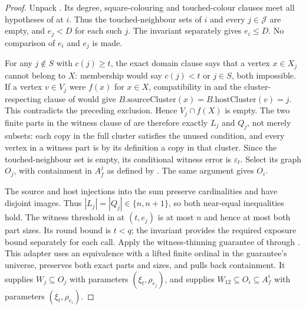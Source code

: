 \begin{proof}
Unpack . Its degree, square-colouring and
touched-colour clauses meet all hypotheses of
 at $i$. Thus the touched-neighbour
sets of $i$ and every $j\in\mathcal J$ are empty, and $e_j<D$ for each
such $j$. The invariant separately gives $e_i\le D$. No comparison of
$e_i$ and $e_j$ is made.

For any $j\notin S$ with $c(j)\ge t$, the exact domain clause says that
a vertex $x\in X_j$ cannot belong to $X$: membership would say
$c(j)<t$ or $j\in S$, both impossible. If a vertex $v\in V_j$ were
$f(x)$ for $x\in X$, compatibility in
 and the cluster-respecting clause
of  would give
$B.\mathrm{sourceCluster}(x)=B.\mathrm{hostCluster}(v)=j$.
This contradicts the preceding exclusion. Hence $V_j\cap f(X)$ is empty.
The two finite parts in the witness clause of
 are therefore exactly $L_j$ and $Q_j$,
not merely subsets: each copy in the full cluster satisfies the unused
condition, and every vertex in a witness part is by its definition a
copy in that cluster. Since the touched-neighbour set is empty, its
conditional witness error is $\varepsilon_t$. Select its graph $O_j$,
with containment in $A_f^j$ as defined by
. The same argument gives $O_i$.

The source and host injections into the sum preserve cardinalities and
have disjoint images. Thus $|L_j|=|Q_j|\in\{n,n+1\}$, so both
near-equal inequalities hold. The witness threshold in
 at $(t,e_j)$ is at most $n$ and
hence at most both part sizes. Its round bound is $t<q$; the invariant
provides the required exposure bound separately for each call.
Apply the witness-thinning guarantee of
 through
. This adapter uses an equivalence
with a lifted finite ordinal in the guarantee's universe, preserves
both exact parts and sizes, and pulls back containment. It supplies
$W_j\subseteq O_j$ with parameters $(\xi_t,\rho_{e_j})$, and supplies
$W_{12}\subseteq O_i\subseteq A_f^i$ with parameters
$(\xi_t,\rho_{e_i})$.


\end{proof}
